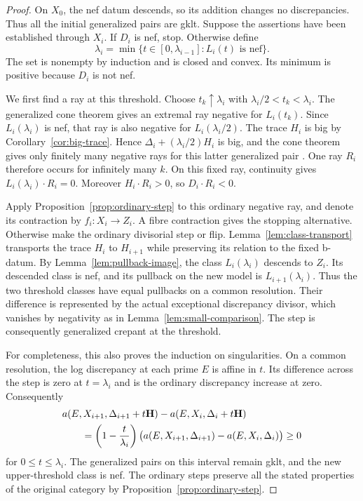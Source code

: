 \begin{proof}
On \(X_0\), the nef datum descends, so its addition changes no
discrepancies.  Thus all the initial generalized pairs are gklt.
Suppose the assertions have been established through \(X_i\).
If \(D_i\) is nef, stop.  Otherwise define
\[
 \lambda_i=\min\{t\in[0,\lambda_{i-1}]:L_i(t)\text{ is nef}\}.
\]
The set is nonempty by induction and is closed and convex.  Its minimum
is positive because \(D_i\) is not nef.

We first find a ray at this threshold.  Choose
\(t_k\uparrow\lambda_i\) with \(\lambda_i/2<t_k<\lambda_i\).
The generalized cone theorem gives an extremal ray negative for
\(L_i(t_k)\).  Since \(L_i(\lambda_i)\) is nef, that ray is also
negative for \(L_i(\lambda_i/2)\).  The trace \(H_i\) is big by
Corollary~\ref{cor:big-trace}.  Hence
\(\Delta_i+(\lambda_i/2)H_i\) is big, and the cone theorem gives
only finitely many negative rays for this latter generalized pair
\cite[Theorem~1.3]{HX2026}.  One ray \(R_i\) therefore occurs for
infinitely many \(k\).  On this fixed ray, continuity gives
\(L_i(\lambda_i)\cdot R_i=0\).  Moreover
\(H_i\cdot R_i>0\), so \(D_i\cdot R_i<0\).

Apply Proposition~\ref{prop:ordinary-step} to this ordinary negative
ray, and denote its contraction by \(f_i:X_i\to Z_i\).  A fibre
contraction gives the stopping alternative.  Otherwise make the
ordinary divisorial step or flip.  Lemma~\ref{lem:class-transport}
transports the trace \(H_i\) to \(H_{i+1}\) while preserving its
relation to the fixed b-datum.  By Lemma~\ref{lem:pullback-image}, the
class \(L_i(\lambda_i)\) descends to \(Z_i\).  Its descended class
is nef, and its pullback on the new model is
\(L_{i+1}(\lambda_i)\).  Thus the two threshold classes have equal
pullbacks on a common resolution.  Their difference is represented by
the actual exceptional discrepancy divisor, which vanishes by
negativity as in Lemma~\ref{lem:small-comparison}.  The step is
consequently generalized crepant at the threshold.

For completeness, this also proves the induction on singularities.
On a common resolution, the log discrepancy at each prime \(E\) is
affine in \(t\).  Its difference across the step is zero at
\(t=\lambda_i\) and is the ordinary discrepancy increase at zero.
Consequently
\begin{align}
 &a(E,X_{i+1},\Delta_{i+1}+t\mathbf H)
       -a(E,X_i,\Delta_i+t\mathbf H)\notag\\
 &\qquad=\left(1-\frac{t}{\lambda_i}\right)
     \bigl(a(E,X_{i+1},\Delta_{i+1})-a(E,X_i,\Delta_i)\bigr)
     \geq0\label{eq:scaling-interpolation}
\end{align}
for \(0\leq t\leq\lambda_i\).  The generalized pairs on this
interval remain gklt, and the new upper-threshold class is nef.  The
ordinary steps preserve all the stated properties of the original
category by Proposition~\ref{prop:ordinary-step}.
\end{proof}
